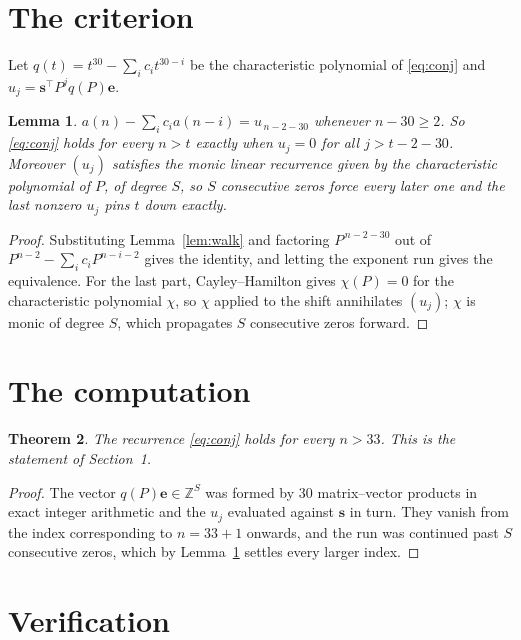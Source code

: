 \documentclass[11pt,a4paper]{article}
\theoremstyle{plain}
\newtheorem{theorem}{Theorem}
\newtheorem{lemma}[theorem]{Lemma}
\theoremstyle{definition}
\begin{document}
\section{The criterion}

Let $q(t)=t^{30}-\sum_i c_i t^{30-i}$ be the characteristic polynomial of
\eqref{eq:conj} and $u_j=\mathbf{s}^{\!\top}P^{j}q(P)\mathbf{e}$.

\begin{lemma}\label{lem:crit}
$a(n)-\sum_i c_i a(n-i)=u_{\,n-2-30}$ whenever $n-30\ge2$. So \eqref{eq:conj}
holds for every $n>t$ exactly when $u_j=0$ for all $j>t-2-30$. Moreover $(u_j)$
satisfies the monic linear recurrence given by the characteristic polynomial of $P$, of
degree $S$, so $S$ consecutive zeros force every later one and the last nonzero $u_j$ pins
$t$ down exactly.
\end{lemma}

\begin{proof}
Substituting Lemma~\ref{lem:walk} and factoring $P^{\,n-2-30}$ out of
$P^{n-2}-\sum_i c_i P^{n-i-2}$ gives the identity, and letting the exponent run gives the
equivalence. For the last part, Cayley--Hamilton gives $\chi(P)=0$ for the characteristic
polynomial $\chi$, so $\chi$ applied to the shift annihilates $(u_j)$; $\chi$ is monic of
degree $S$, which propagates $S$ consecutive zeros forward.
\end{proof}

\section{The computation}

\begin{theorem}
The recurrence \eqref{eq:conj} holds for every $n>33$. This is the statement of
Section~1.
\end{theorem}

\begin{proof}
The vector $q(P)\mathbf{e}\in\mathbb{Z}^{S}$ was formed by $30$ matrix--vector
products in exact integer arithmetic and the $u_j$ evaluated against $\mathbf{s}$ in turn.
They vanish from the index corresponding to $n=33+1$ onwards, and the run was continued
past $S$ consecutive zeros, which by Lemma~\ref{lem:crit} settles every larger index.
\end{proof}

\section{Verification}
\end{document}
